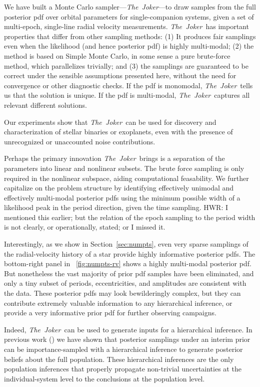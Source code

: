 \documentclass[manuscript, letterpaper]{aastex6}
\newcommand{\project}[1]{\textsl{#1}}
\newcommand{\samplername}{\project{The~Joker}}
\newcommand{\sectionname}{Section}
\begin{document}
We have built a Monte Carlo sampler---\samplername---to draw samples from the
full posterior pdf over orbital parameters for single-companion systems,
given a set of multi-epoch, single-line radial velocity measurements.
\samplername\ has important properties that differ from other sampling methods:
(1) It produces fair samplings even when the likelihood (and hence posterior
pdf) is highly multi-modal; (2) the method is based on Simple Monte Carlo,  in
some sense a pure brute-force method, which parallelizes trivially; and (3) the
samplings are guaranteed to be correct under the sensible assumptions presented here,
without the need for convergence or other diagnostic checks.
If the pdf is monomodal, \samplername\ tells us that the solution is unique.
If the pdf is multi-modal, \samplername\ captures all relevant different solutions.

Our experiments show that \samplername\ can be used for discovery and
characterization of stellar binaries or exoplanets, even with the presence of
unrecognized or unaccounted noise contributions.


Perhaps the primary innovation \samplername\ brings is a separation of the parameters into linear
and nonlinear subsets. The brute force sampling is only required in the
nonlinear subspace, aiding computational feasability.
We further capitalize on the problem structure by identifying effectively
unimodal and effectively multi-modal posterior pdfs using the minimum possible
width of a likelihood peak in the period direction, given the time sampling.
{\color{red} HWR: I mentioned this earlier; but the relation of the epoch sampling
to the period width is not clearly, or operationally, stated; or I missed it.}

Interestingly, as we show in \sectionname~\ref{sec:numpts}, even very sparse
samplings of the radial-velocity history of a star provide highly
informative posterior pdfs.  The bottom-right panel in
 \figurename~\ref{fig:numpts-rv} shows a highly
multi-modal posterior pdf. But nonetheless
the vast majority of prior pdf samples have been eliminated, and
only a tiny subset of periods, eccentricities, and amplitudes are
consistent with the data.
These posterior pdfs may look bewilderingly complex, but they can contribute
extremely valuable information to any hierarchical inference, or
provide a very informative prior pdf for further observing campaigns.


Indeed,  \samplername\  can be used to generate inputs for a hierarchical inference.
In previous work (\citealt{Hogg:2010, Foreman-Mackey:2014}) we have shown
that posterior samplings under an interim prior can be importance-sampled
with a hierarchical inference to generate posterior beliefs about the
full population.
These hierarchical inferences are the only population inferences
that properly propagate non-trivial uncertainties at the
individual-system level to the conclusions at the population level.
\end{document}
